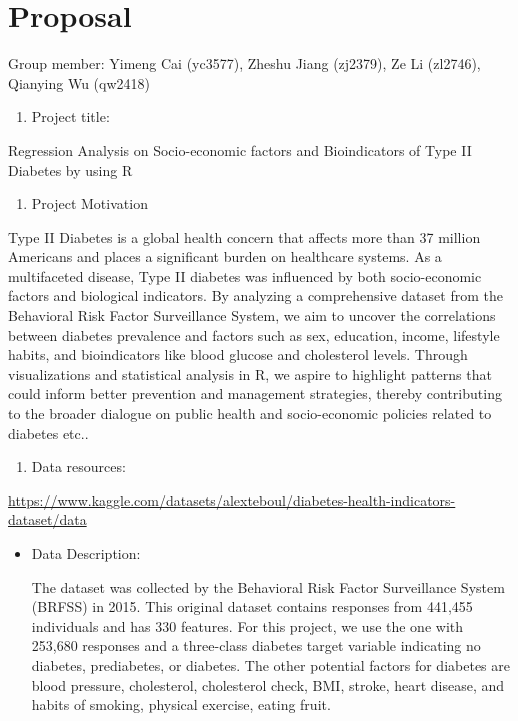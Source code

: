 \documentclass[
]{article}
\author{}
\date{\vspace{-2.5em}}
\providecommand{\tightlist}{%
  \setlength{\itemsep}{0pt}\setlength{\parskip}{0pt}}
\begin{document}
\hypertarget{proposal}{%
\section{Proposal}\label{proposal}}

Group member: Yimeng Cai (yc3577), Zheshu Jiang (zj2379), Ze Li
(zl2746), Qianying Wu (qw2418)

\begin{enumerate}
\def\labelenumi{\arabic{enumi}.}
\tightlist
\item
  Project title:
\end{enumerate}

Regression Analysis on Socio-economic factors and Bioindicators of Type
II Diabetes by using R

\begin{enumerate}
\def\labelenumi{\arabic{enumi}.}
\setcounter{enumi}{1}
\tightlist
\item
  Project Motivation
\end{enumerate}

Type II Diabetes is a global health concern that affects more than 37
million Americans and places a significant burden on healthcare systems.
As a multifaceted disease, Type II diabetes was influenced by both
socio-economic factors and biological indicators. By analyzing a
comprehensive dataset from the Behavioral Risk Factor Surveillance
System, we aim to uncover the correlations between diabetes prevalence
and factors such as sex, education, income, lifestyle habits, and
bioindicators like blood glucose and cholesterol levels. Through
visualizations and statistical analysis in R, we aspire to highlight
patterns that could inform better prevention and management strategies,
thereby contributing to the broader dialogue on public health and
socio-economic policies related to diabetes etc..

\begin{enumerate}
\def\labelenumi{\arabic{enumi}.}
\setcounter{enumi}{2}
\tightlist
\item
  Data resources:
\end{enumerate}

\url{https://www.kaggle.com/datasets/alexteboul/diabetes-health-indicators-dataset/data}

\begin{itemize}
\item
  Data Description:

  The dataset was collected by the Behavioral Risk Factor Surveillance
  System (BRFSS) in 2015. This original dataset contains responses from
  441,455 individuals and has 330 features. For this project, we use the
  one with 253,680 responses and a three-class diabetes target variable
  indicating no diabetes, prediabetes, or diabetes. The other potential
  factors for diabetes are blood pressure, cholesterol, cholesterol
  check, BMI, stroke, heart disease, and habits of smoking, physical
  exercise, eating fruit.
\end{itemize}
\end{document}
